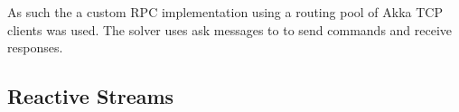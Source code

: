 \documentclass{article}
\begin{document}
As such the a custom RPC implementation using a routing pool of Akka TCP clients was used. The solver uses ask messages to to send commands and receive responses. 






\subsection{Reactive Streams}
\end{document}
